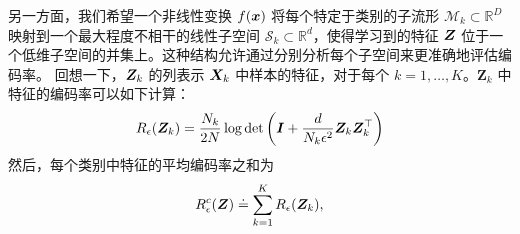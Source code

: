 \documentclass[../../book-main.tex]{subfiles}
\begin{document}
另一方面，我们希望一个非线性变换 $f(\bm{x})$ 将每个特定于类别的子流形 $\mathcal{M}_k \subset \mathbb{R}^D$ 映射到一个最大程度不相干的线性子空间 $\mathcal{S}_k \subset \mathbb{R}^d$，使得学习到的特征 $\bm{Z}$ 位于一个低维子空间的并集上。这种结构允许通过分别分析每个子空间来更准确地评估编码率。%
回想一下，$\bm{Z}_k$ 的列表示 $\bm{X}_k$ 中样本的特征，对于每个 $k=1,\dots,K$。$\bm Z_k$ 中特征的编码率可以如下计算：
\begin{align}
    R_{\epsilon}(\bm{Z}_k) = \frac{N_k}{2N}\log\det\left(\bm{I} + \frac{d}{N_k\epsilon^{2}}\bm{Z}_k\bm{Z}_k^{\top}\right)
\end{align}
然后，每个类别中特征的平均编码率之和为
\begin{equation}
	 R_{\epsilon}^c(\bm{Z}) \doteq \sum_{k=1}^K R_{\epsilon}(\bm{Z}_k),
	\label{chap4-eqn:compress-loss-eval}
\end{equation}
\end{document}

